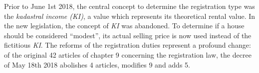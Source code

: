Prior to June 1st 2018, the central concept to determine the registration type was the \textit{kadastral income (KI)}, a value which represents its theoretical rental value. 
In the new legislation, the concept of \textit{KI} was abandoned. 
To determine if a house should be considered ``modest'',  its actual selling price is now used instead of the fictitious \textit{KI}.
The reforms of the registration duties represent a profound change: of the original 42 articles of chapter 9 concerning the registration law, the decree of May 18th 2018 abolishes 4 articles, modifies 9 and adds 5.%

